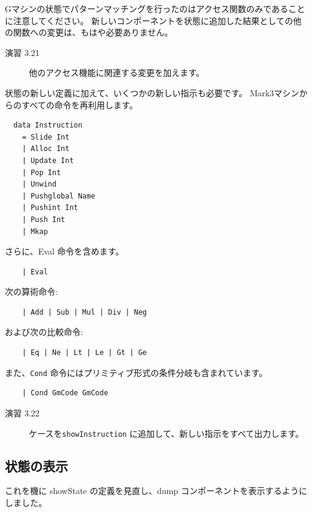\documentclass{jbook}
\begin{document}
Gマシンの状態でパターンマッチングを行ったのはアクセス関数のみであることに注意してください。
新しいコンポーネントを状態に追加した結果としての他の関数への変更は、もはや必要ありません。

\begin{description}
	\item[演習 3.21] 他のアクセス機能に関連する変更を加えます。
\end{description}

状態の新しい定義に加えて、いくつかの新しい指示も必要です。
Mark3マシンからのすべての命令を再利用します。

\begin{verbatim}
  data Instruction
    = Slide Int
    | Alloc Int
    | Update Int
    | Pop Int
    | Unwind
    | Pushglobal Name
    | Pushint Int
    | Push Int
    | Mkap
\end{verbatim}

さらに、Eval 命令を含めます。

\begin{verbatim}
    | Eval
\end{verbatim}

次の算術命令:

\begin{verbatim}
    | Add | Sub | Mul | Div | Neg
\end{verbatim}

および次の比較命令:

\begin{verbatim}
    | Eq | Ne | Lt | Le | Gt | Ge
\end{verbatim}

また、\texttt{Cond} 命令にはプリミティブ形式の条件分岐も含まれています。

\begin{verbatim}
    | Cond GmCode GmCode
\end{verbatim}

\begin{description}
	\item[演習 3.22] ケースを\texttt{showInstruction} に追加して、新しい指示をすべて出力します。
\end{description}

\subsection{状態の表示}

これを機に showState の定義を見直し、dump コンポーネントを表示するようにしました。
\end{document}
